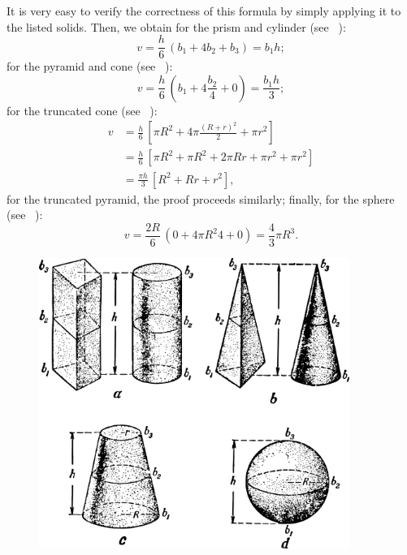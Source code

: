 \ans It is very easy to verify the correctness of this formula by simply applying it to the listed solids. Then, we obtain for the prism and cylinder (see ~):
\begin{equation*}%
v = \frac{h}{6}\, (b_{1} + 4b_{2} + b_{3}) = b_{1}h;
\end{equation*}
for the pyramid and cone (see ~):
\begin{equation*}%
v = \frac{h}{6}\, (b_{1} + 4\frac{b_{2}}{4} + 0) = \frac{b_{1}h}{3};
\end{equation*}
for the truncated cone (see ~):
\begin{align*}%
v & = \frac{h}{6}\, \left[ \pi R^{2} + 4 \pi \frac{(R + r)^{2}}{2} + \pi r^{2} \right] \\ 
& = \frac{h}{6}\, \left[ \pi R^{2} + \pi R^{2} + 2 \pi Rr +  \pi r^{2} + \pi r^{2} \right] \\ 
& = \frac{\pi h}{3}\, \left[ R^{2} + Rr + r^{2}\right],
\end{align*}
for the truncated pyramid, the proof proceeds similarly; finally, for the sphere (see ~):
\begin{equation*}%
v = \frac{2R}{6}\, (0 + 4 \pi R^{2}{4} + 0) = \frac{4}{3}\pi R^{3}.
\end{equation*}

\begin{figure}[h!]
\centering
\includegraphics[width=0.9\textwidth]{figures/ch-01/fig-01-17.pdf}
\end{figure}

